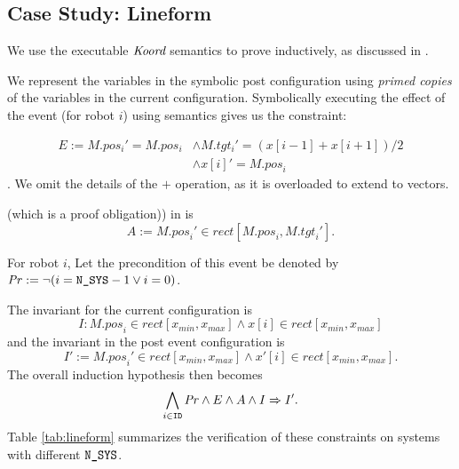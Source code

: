 \subsection{Case Study: Lineform}

We use the executable $\emph{Koord}$ semantics to prove  inductively, as discussed in .

We represent the variables in the symbolic post configuration using \emph{primed copies} of the variables in the current configuration. Symbolically executing the effect of the event  (for robot $i$) using \K semantics gives us the constraint:

\begin{align*}E := \mathit{M.pos_i}' = M.pos_i &\wedge \mathit{M.tgt_i}' = (x[i-1] + x[i+1])/2 \\ &\wedge x[i]' = \mathit{M.pos}_i\end{align*}.
We omit the details of the $+$ operation, as it is overloaded to extend to vectors.

 (which is a proof obligation)) in  is $$A := \mathit{M.pos}_i' \in \mathit{rect}[\mathit{M.pos}_i,\mathit{M.tgt}_i'].$$



For robot $i$, Let the precondition of this event be denoted by $\mathit{Pr}:= \neg (i = \texttt{N\_SYS} - 1 \vee i = 0)$.


The invariant for the current configuration is $$I: \mathit{M.pos}_i \in \mathit{rect}[x_{min}, x_{max}] \wedge x[i] \in \mathit{rect}[x_{min}, x_{max}]$$ and the invariant in the post event configuration is $$I' := \mathit{M.pos}_i' \in \mathit{rect}[x_{min}, x_{max}] \wedge x'[i] \in \mathit{rect}[x_{min}, x_{max}].$$
The overall induction hypothesis then becomes $$ \bigwedge_{i\in \texttt{ID}}\mathit{Pr} \wedge E \wedge A \wedge  I \Rightarrow I'.$$
Table \ref{tab:lineform} summarizes the verification of these constraints on systems with different $\texttt{N\_SYS}$.

